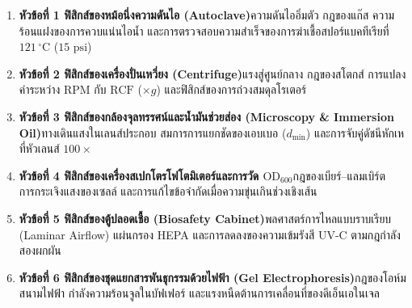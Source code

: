 \begin{conceptbox}
\begin{enumerate}
    \item \textbf{หัวข้อที่ 1 ฟิสิกส์ของหม้อนึ่งความดันไอ (Autoclave)}\quad ความดันไออิ่มตัว กฎของแก๊ส ความร้อนแฝงของการควบแน่นไอน้ำ และการตรวจสอบความสำเร็จของการฆ่าเชื้อสปอร์แบคทีเรียที่ $121\,^\circ\text{C}$ ($15\text{ psi}$)
    \item \textbf{หัวข้อที่ 2 ฟิสิกส์ของเครื่องปั่นเหวี่ยง (Centrifuge)}\quad แรงสู่ศูนย์กลาง กฎของสโตกส์ การแปลงค่าระหว่าง $\text{RPM}$ กับ $\text{RCF}$ ($\times g$) และฟิสิกส์ของการถ่วงสมดุลโรเตอร์
    \item \textbf{หัวข้อที่ 3 ฟิสิกส์ของกล้องจุลทรรศน์และน้ำมันช่วยส่อง (Microscopy \& Immersion Oil)}\quad ทางเดินแสงในเลนส์ประกอบ สมการการแยกชัดของเอบเบอ ($d_{\min}$) และการจับคู่ดัชนีหักเหที่หัวเลนส์ $100\times$
    \item \textbf{หัวข้อที่ 4 ฟิสิกส์ของเครื่องสเปกโตรโฟโตมิเตอร์และการวัด $\text{OD}_{600}$}\quad กฎของเบียร์--แลมเบิร์ต การกระเจิงแสงของเซลล์ และการแก้ไขข้อจำกัดเมื่อความขุ่นเกินช่วงเชิงเส้น
    \item \textbf{หัวข้อที่ 5 ฟิสิกส์ของตู้ปลอดเชื้อ (Biosafety Cabinet)}\quad พลศาสตร์การไหลแบบราบเรียบ (Laminar Airflow) แผ่นกรอง HEPA และการลดลงของความเข้มรังสี UV-C ตามกฎกำลังสองผกผัน
    \item \textbf{หัวข้อที่ 6 ฟิสิกส์ของชุดแยกสารพันธุกรรมด้วยไฟฟ้า (Gel Electrophoresis)}\quad กฎของโอห์ม สนามไฟฟ้า กำลังความร้อนจูลในบัฟเฟอร์ และแรงหนืดต้านการเคลื่อนที่ของดีเอ็นเอในเจล
\end{enumerate}
\end{conceptbox}

